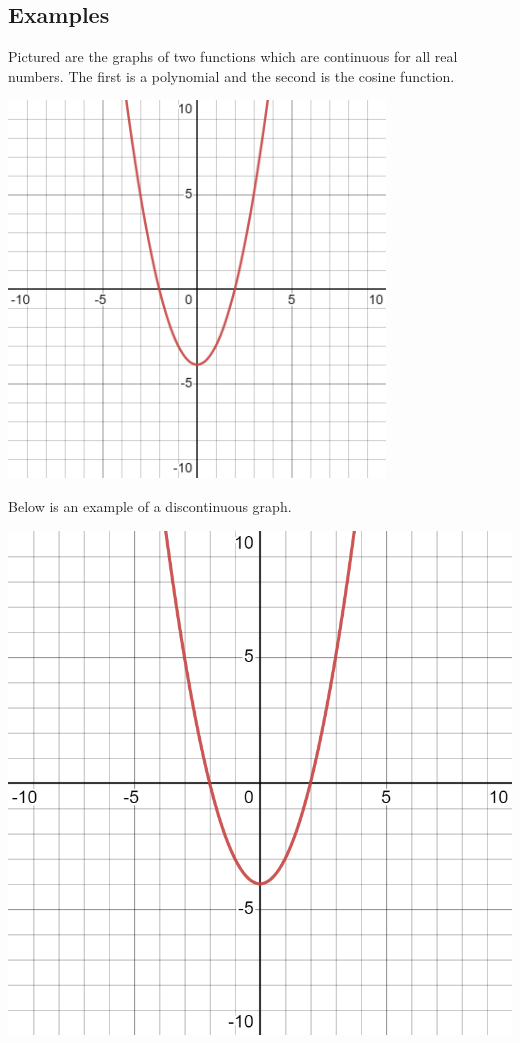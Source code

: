 \documentclass{ximera}
\begin{document}
\subsection{Examples}

Pictured are the graphs of two functions which are continuous for all real numbers. The first is a polynomial and the second is the cosine function.

\begin{center}
    \includegraphics[width=0.75\textwidth]{graph5.png}
\end{center}

Below is an example of a discontinuous graph.

\begin{center}
    \includegraphics[width=\textwidth]{graph6.png}
\end{center}
\end{document}
